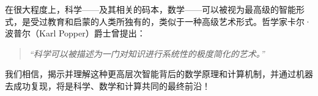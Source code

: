 \documentclass[../../book-main_zh.tex]{subfiles}
\begin{document}
在很大程度上，科学——及其相关的码本，数学——可以被视为最高级的智能形式，是受过教育和启蒙的人类所独有的，类似于一种高级艺术形式。哲学家卡尔·波普尔（Karl Popper）爵士曾提出：
\begin{quote}
    \centering
    \textit{``科学可以被描述为一门对知识进行系统性的极度简化的艺术。''}
\end{quote}
我们相信，揭示并理解这种更高层次智能背后的数学原理和计算机制，并通过机器去成功复现，将是科学、数学和计算共同的最终前沿！
\end{document}
